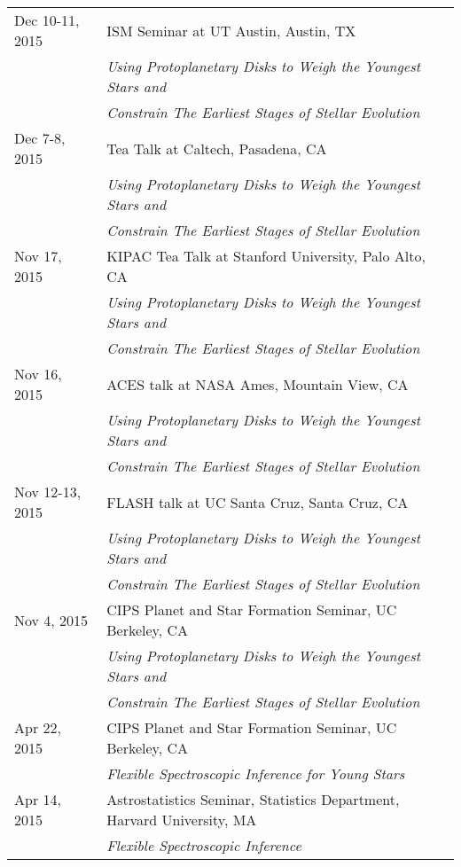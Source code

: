 \documentclass[10pt]{article}
\newcommand{\rowskip}{1.2mm}
\begin{document}
\begin{tabular*}{\textwidth}{@{\hspace{10pt}}p{1.2in}l}
  Dec 10-11, 2015 & ISM Seminar at UT Austin, Austin, TX \\
  & \emph{Using Protoplanetary Disks to Weigh the Youngest Stars and} \\
  & \emph{Constrain The Earliest Stages of Stellar Evolution} \\[\rowskip]
  Dec 7-8, 2015 & Tea Talk at Caltech, Pasadena, CA \\
  & \emph{Using Protoplanetary Disks to Weigh the Youngest Stars and} \\
  & \emph{Constrain The Earliest Stages of Stellar Evolution} \\[\rowskip]
  Nov 17, 2015 & KIPAC Tea Talk at Stanford University, Palo Alto, CA \\
  & \emph{Using Protoplanetary Disks to Weigh the Youngest Stars and} \\
  & \emph{Constrain The Earliest Stages of Stellar Evolution} \\[\rowskip]
  Nov 16, 2015 & ACES talk at NASA Ames, Mountain View, CA \\
  & \emph{Using Protoplanetary Disks to Weigh the Youngest Stars and} \\
  & \emph{Constrain The Earliest Stages of Stellar Evolution} \\[\rowskip]
  Nov 12-13, 2015 & FLASH talk at UC Santa Cruz, Santa Cruz, CA \\
  & \emph{Using Protoplanetary Disks to Weigh the Youngest Stars and} \\
  & \emph{Constrain The Earliest Stages of Stellar Evolution} \\[\rowskip]
  Nov 4, 2015 & CIPS Planet and Star Formation Seminar, UC Berkeley, CA\\
  & \emph{Using Protoplanetary Disks to Weigh the Youngest Stars and} \\
  & \emph{Constrain The Earliest Stages of Stellar Evolution} \\[\rowskip]
  Apr 22, 2015 & CIPS Planet and Star Formation Seminar, UC Berkeley, CA\\
  & \emph{Flexible Spectroscopic Inference for Young Stars} \\[\rowskip]
  Apr 14, 2015 & Astrostatistics Seminar, Statistics Department, Harvard University, MA \\
  & \emph{Flexible Spectroscopic Inference} \\[\rowskip]
\end{tabular*}
\end{document}
